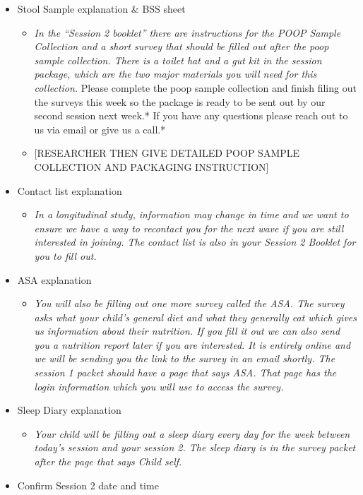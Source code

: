 \documentclass[]{book}
\providecommand{\tightlist}{%
  \setlength{\itemsep}{0pt}\setlength{\parskip}{0pt}}
\begin{document}
\begin{itemize}
\item
  Stool Sample explanation \& BSS sheet

  \begin{itemize}
  \item
    \emph{In the ``Session 2 booklet'' there are instructions for the POOP Sample Collection and a short survey that should be filled out after the poop sample collection. There is a toilet hat and a gut kit in the session package, which are the two major materials you will need for this collection. }Please complete the poop sample collection and finish filing out the surveys this week so the package is ready to be sent out by our second session next week.* If you have any questions please reach out to us via email or give us a call.*
  \item
    {[}RESEARCHER THEN GIVE DETAILED POOP SAMPLE COLLECTION AND PACKAGING INSTRUCTION{]}
  \end{itemize}
\item
  Contact list explanation

  \begin{itemize}
  \tightlist
  \item
    \emph{In a longitudinal study, information may change in time and we want to ensure we have a way to recontact you for the next wave if you are still interested in joining. The contact list is also in your Session 2 Booklet for you to fill out.}
  \end{itemize}
\item
  ASA explanation

  \begin{itemize}
  \tightlist
  \item
    \emph{You will also be filling out one more survey called the ASA. The survey asks what your child's general diet and what they generally eat which gives us information about their nutrition. If you fill it out we can also send you a nutrition report later if you are interested. It is entirely online and we will be sending you the link to the survey in an email shortly. The session 1 packet should have a page that says ASA. That page has the login information which you will use to access the survey. }
  \end{itemize}
\item
  Sleep Diary explanation

  \begin{itemize}
  \tightlist
  \item
    \emph{Your child will be filling out a sleep diary every day for the week between today's session and your session 2. The sleep diary is in the survey packet after the page that says Child self.}
  \end{itemize}
\item
  Confirm Session 2 date and time


\end{itemize}
\end{document}
